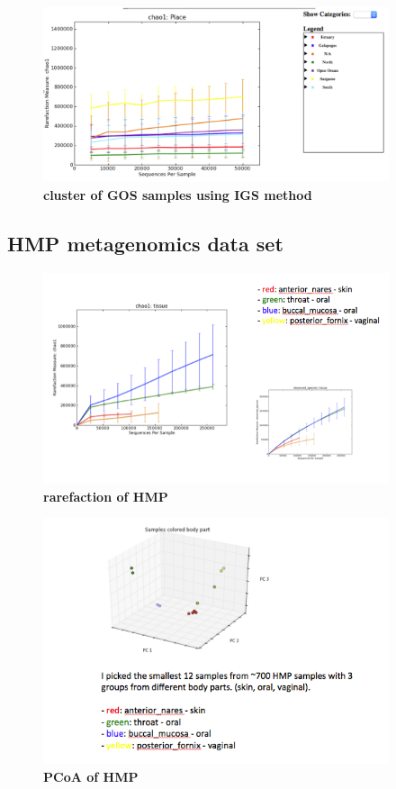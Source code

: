\begin{figure}[!ht]
 \centerline{\includegraphics[width=4in]{./figures/GOS_chao.png}}
\caption{\bf cluster of GOS samples using IGS method}
\label{fig:concept}
\end{figure}




\subsection{HMP metagenomics data set}

\begin{figure}[!ht]
 \centerline{\includegraphics[width=4in]{./figures/HMP_alpha.png}}
\caption{\bf rarefaction of HMP}
\label{fig:concept}
\end{figure}

\begin{figure}[!ht]
 \centerline{\includegraphics[width=4in]{./figures/HMP_beta.png}}
\caption{\bf PCoA of HMP}
\label{fig:concept}
\end{figure}



